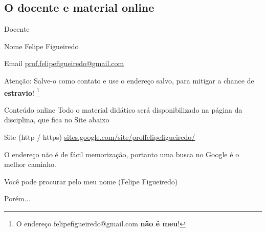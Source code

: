 \documentclass{beamer}
\begin{document}
\subsection{O docente e material online}

\begin{frame}{Docente}
  \begin{block}{Nome}
    Felipe Figueiredo
  \end{block}
  \begin{block}{Email}
    \url{prof.felipefigueiredo@gmail.com}

    \bigskip
    \small
    \alert{Atenção:} Salve-o como contato e use o endereço salvo, para mitigar a chance de {\bf estravio}!
    \footnote{O endereço felipefigueiredo@gmail.com {\bf não é meu}!}
  \end{block}
\end{frame}

\begin{frame}{Conteúdo online}
  Todo o material didático será disponibilizado na página da disciplina, que fica no Site abaixo
  \begin{block}{Site (http / https)}
    \small
    \url{sites.google.com/site/proffelipefigueiredo/}
  \end{block}

  \bigskip
  O endereço não é de fácil memorização, portanto uma busca no Google é o melhor caminho.

  \bigskip
  Você pode procurar pelo meu nome (Felipe Figueiredo)

  \bigskip
  \bigskip
  Porém...
\end{frame}
\end{document}
